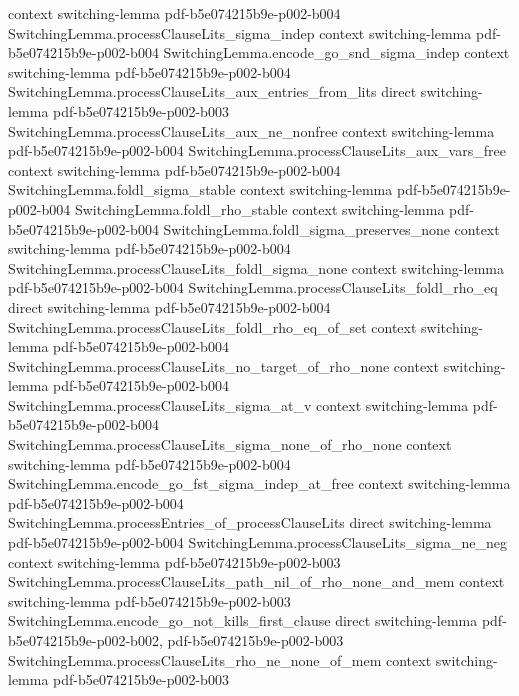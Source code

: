 \begin{theorem}
  {context}
  {switching-lemma}
  {pdf-b5e074215b9e-p002-b004}
\proofstep
  {SwitchingLemma.processClauseLits_sigma_indep}
  {context}
  {switching-lemma}
  {pdf-b5e074215b9e-p002-b004}
\proofstep
  {SwitchingLemma.encode_go_snd_sigma_indep}
  {context}
  {switching-lemma}
  {pdf-b5e074215b9e-p002-b004}
\proofstep
  {SwitchingLemma.processClauseLits_aux_entries_from_lits}
  {direct}
  {switching-lemma}
  {pdf-b5e074215b9e-p002-b003}
\proofstep
  {SwitchingLemma.processClauseLits_aux_ne_nonfree}
  {context}
  {switching-lemma}
  {pdf-b5e074215b9e-p002-b004}
\proofstep
  {SwitchingLemma.processClauseLits_aux_vars_free}
  {context}
  {switching-lemma}
  {pdf-b5e074215b9e-p002-b004}
\proofstep
  {SwitchingLemma.foldl_sigma_stable}
  {context}
  {switching-lemma}
  {pdf-b5e074215b9e-p002-b004}
\proofstep
  {SwitchingLemma.foldl_rho_stable}
  {context}
  {switching-lemma}
  {pdf-b5e074215b9e-p002-b004}
\proofstep
  {SwitchingLemma.foldl_sigma_preserves_none}
  {context}
  {switching-lemma}
  {pdf-b5e074215b9e-p002-b004}
\proofstep
  {SwitchingLemma.processClauseLits_foldl_sigma_none}
  {context}
  {switching-lemma}
  {pdf-b5e074215b9e-p002-b004}
\proofstep
  {SwitchingLemma.processClauseLits_foldl_rho_eq}
  {direct}
  {switching-lemma}
  {pdf-b5e074215b9e-p002-b004}
\proofstep
  {SwitchingLemma.processClauseLits_foldl_rho_eq_of_set}
  {context}
  {switching-lemma}
  {pdf-b5e074215b9e-p002-b004}
\proofstep
  {SwitchingLemma.processClauseLits_no_target_of_rho_none}
  {context}
  {switching-lemma}
  {pdf-b5e074215b9e-p002-b004}
\proofstep
  {SwitchingLemma.processClauseLits_sigma_at_v}
  {context}
  {switching-lemma}
  {pdf-b5e074215b9e-p002-b004}
\proofstep
  {SwitchingLemma.processClauseLits_sigma_none_of_rho_none}
  {context}
  {switching-lemma}
  {pdf-b5e074215b9e-p002-b004}
\proofstep
  {SwitchingLemma.encode_go_fst_sigma_indep_at_free}
  {context}
  {switching-lemma}
  {pdf-b5e074215b9e-p002-b004}
\proofstep
  {SwitchingLemma.processEntries_of_processClauseLits}
  {direct}
  {switching-lemma}
  {pdf-b5e074215b9e-p002-b004}
\proofstep
  {SwitchingLemma.processClauseLits_sigma_ne_neg}
  {context}
  {switching-lemma}
  {pdf-b5e074215b9e-p002-b003}
\proofstep
  {SwitchingLemma.processClauseLits_path_nil_of_rho_none_and_mem}
  {context}
  {switching-lemma}
  {pdf-b5e074215b9e-p002-b003}
\proofstep
  {SwitchingLemma.encode_go_not_kills_first_clause}
  {direct}
  {switching-lemma}
  {pdf-b5e074215b9e-p002-b002,
    pdf-b5e074215b9e-p002-b003}
\proofstep
  {SwitchingLemma.processClauseLits_rho_ne_none_of_mem}
  {context}
  {switching-lemma}
  {pdf-b5e074215b9e-p002-b003}

\end{theorem}
